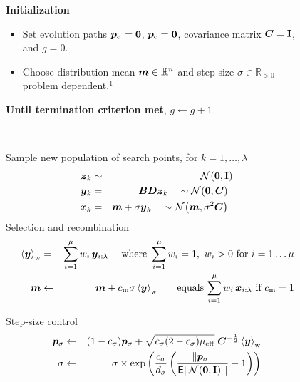 \documentclass{article} %
\newcommand{\R}{\mathbb{R}}
\newcommand{\ve}[1]{\mathchoice{\mbox{\boldmath$\displaystyle#1$}}
  {\mbox{\boldmath$\textstyle#1$}} {\mbox{\boldmath$\scriptstyle#1$}}
  {\mbox{\boldmath$\scriptscriptstyle#1$}}}
\newcommand{\ma}[1]{\mathchoice{\mbox{\boldmath$\displaystyle#1$}}
  {\mbox{\boldmath$\textstyle#1$}} {\mbox{\boldmath$\scriptstyle#1$}}
  {\mbox{\boldmath$\scriptscriptstyle#1$}}}
\newcommand{\auge}[1]{\textbf{#1}}
\newcommand{\N}{\ensuremath{n}}
\newcommand{\Rn}{\R^{\N}}
\newcommand{\rklam}[1]{\left({#1}\right)}
\newcommand{\mueff}{\ensuremath{\mu_\mathrm{eff}}}
\newcommand{\summ}[2]{\sum_{#1=1}^{#2}}
\newcommand{\lam}{\ensuremath{\lambda}}
\newcommand{\sig}{\ensuremath{\sigma}}
\newcommand{\pc}{\ve{p}_\mathrm{c}}
\newcommand{\cs}{c_\sig}
\newcommand{\ds}{d_\sig}
\newcommand{\ps}{\ve{p}_\sig}
\newcommand{\x}{\ve{x}}
\newcommand{\y}{\ve{y}}
\newcommand{\z}{\ve{z}}
\newcommand{\ilam}{{i:\lam}}
\newcommand{\Normal}[1]{{\mathcal N}\hspace{-0.13em}\left(#1\right)}
\newcommand{\Id}{\mathbf{I}}
\newcommand{\NormalNullI}{{\mathcal N}
        \hspace{-0.13em}\left({\ve{0},\Id}\right)}
\newcommand{\cm}{\ensuremath{c_\mathrm{m}}}%
\newcommand{\chiN}{\mathsf{E}\|\NormalNullI\|}
\newcommand{\xmean}{\ensuremath{\ve{m}}}
\begin{document}
\begin{appendix}
\begin{figure}
{{{\auge{Initialization}
\begin{itemize}
\item[] Set evolution paths $\ps=\ve{0}$,
    $\pc=\ve{0}$, covariance matrix $\ma{C}=\Id$, and $g=0$.

\item[] Choose distribution mean $\xmean\in\Rn$ and step-size
  $\sig\in\R_{>0}$ 
  problem dependent.$^1$
\end{itemize}

\auge{Until termination criterion met}, $g\gets g+1$

~\\
\hspace*{\fill}\parbox{0.95\textwidth}{
Sample new population of search points, for $k=1,\dots,\lam$
\begin{eqnarray}
   \z_k &\sim&\NormalNullI \\
   \y_k &=& \B\D\z_k \quad\sim \Normal{\ve{0},\C}\enspace  \label{algsampley}\\
   \x_{k} &=& \xmean + \sig\y_k \quad\sim\Normal{\xmean,\sig^2\C}\enspace
   \label{algwgen}
%
\end{eqnarray}
Selection and recombination
\begin{eqnarray}
   \ymean &=& \summ{i}{\mu}w_i\,\y_\ilam
   \quad\mbox{ where }\summ{i}{\mu}w_i=1,~\text{$w_i>0$ for $i=1\dots\mu$}\\
    \xmean &\gets& \xmean + \cm\sig\ymean 
      \qquad\text{equals $\summ{i}{\mu}w_i\,\x_\ilam$ if $\cm=1$} \label{algreco}
%
\end{eqnarray}

Step-size control
\begin{eqnarray}
  \ps &\gets& (1-\cs)\ps %
        + \sqrt{\cs(2-\cs)\mueff}\;
  {\C}^{-\frac{1}{2}} \ymean\label{algps}\\
%
   \sig &\gets& \sig\times
      \exp\rklam{\frac{\cs}{\ds}\rklam{\frac{\|\ps\|}{\chiN}-1}}\label{algsig}
%
\end{eqnarray}

}}}}
\end{figure}
\end{appendix}
\end{document}
